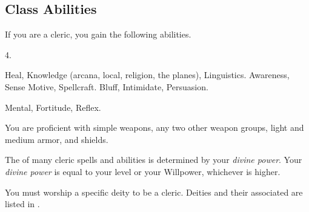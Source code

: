     \subsection{Class Abilities}
        If you are a cleric, you gain the following abilities.

         4.

         Heal, Knowledge (arcana, local, religion, the planes), Linguistics.
         Awareness, Sense Motive, Spellcraft.
         Bluff, Intimidate, Persuasion.

          Mental,  Fortitude,  Reflex.

        You are proficient with simple weapons, any two other weapon groups, light and medium armor, and shields.

        The  of many cleric spells and abilities is determined by your \textit{divine power}.
        Your \textit{divine power} is equal to your level or your Willpower, whichever is higher.

        You must worship a specific deity to be a cleric.
        Deities and their associated  are listed in .

